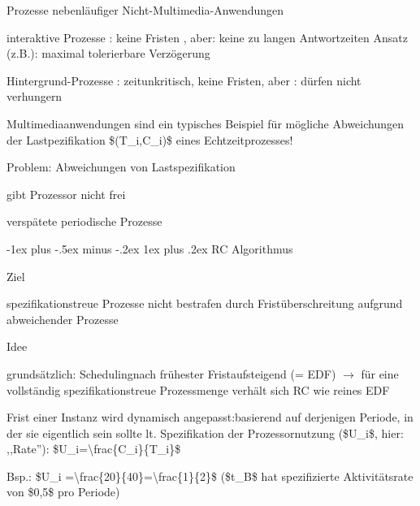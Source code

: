 \documentclass[a4paper]{article}
\makeatletter
\renewcommand{\subsubsection}{\@startsection{subsubsection}{3}{0mm}%
 {-1ex plus -.5ex minus -.2ex}%
 {1ex plus .2ex}%
 {\normalfont\small\bfseries}}
\makeatother
\begin{document}
\begin{multicols}{3}
    \begin{enumerate*}
        \setcounter{enumi}{1}
        \item
        Prozesse nebenläufiger Nicht-Multimedia-Anwendungen
        \begin{itemize*}
            \item interaktive Prozesse : keine Fristen , aber: keine zu langen Antwortzeiten Ansatz (z.B.): maximal tolerierbare Verzögerung
            \item Hintergrund-Prozesse : zeitunkritisch, keine Fristen, aber : dürfen nicht verhungern
        \end{itemize*}
    \end{enumerate*}

    Multimediaanwendungen sind ein typisches Beispiel für mögliche
    Abweichungen der Lastpezifikation \$(T\_i,C\_i)\$ eines
    Echtzeitprozesses!

    Problem: Abweichungen von Lastspezifikation

    \begin{itemize*}
        \item
        gibt Prozessor nicht frei
        \item
        verspätete periodische Prozesse
    \end{itemize*}


    \subsubsection{RC Algorithmus}

    \begin{itemize*}
        \item
        Ziel
        \begin{itemize*}
            \item spezifikationstreue Prozesse nicht bestrafen durch Fristüberschreitung aufgrund abweichender Prozesse
        \end{itemize*}
        \item
        Idee
        \begin{itemize*}
            \item grundsätzlich: Schedulingnach frühester Fristaufsteigend (= EDF) $\rightarrow$ für eine vollständig spezifikationstreue Prozessmenge verhält sich RC wie reines EDF
            \item Frist einer Instanz wird dynamisch angepasst:basierend auf derjenigen Periode, in der sie eigentlich sein sollte lt. Spezifikation der Prozessornutzung (\$U\_i\$, hier: ,,Rate''): \$U\_i=\textbackslash frac\{C\_i\}\{T\_i\}\$
            \item Bsp.: \$U\_i =\textbackslash frac\{20\}\{40\}=\textbackslash frac\{1\}\{2\}\$ (\$t\_B\$ hat spezifizierte Aktivitätsrate von \$0,5\$ pro Periode)
        \end{itemize*}
    \end{itemize*}



\end{multicols}
\end{document}
